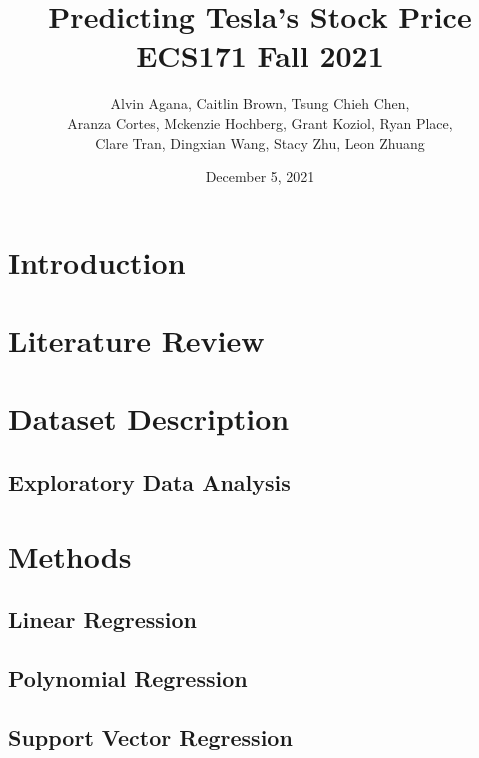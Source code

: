 \documentclass[letterpaper,11pt]{article}
\begin{document}
\title{Predicting Tesla's Stock Price\\
	\large ECS171 Fall 2021}
\author{Alvin Agana, Caitlin Brown, Tsung Chieh Chen, \\Aranza Cortes, Mckenzie Hochberg, Grant Koziol, Ryan Place, \\Clare Tran, Dingxian Wang, Stacy Zhu, Leon Zhuang}
\date{December 5, 2021}
\maketitle
\pagestyle{fancy}
\fancyhf{}
\tableofcontents
\newpage
{}




\section{Introduction}



\section{Literature Review}





\section{Dataset Description}



\subsection{Exploratory Data Analysis}




\section{Methods}

\subsection{Linear Regression}

\subsection{Polynomial Regression}

\subsection{Support Vector Regression}
\end{document}

